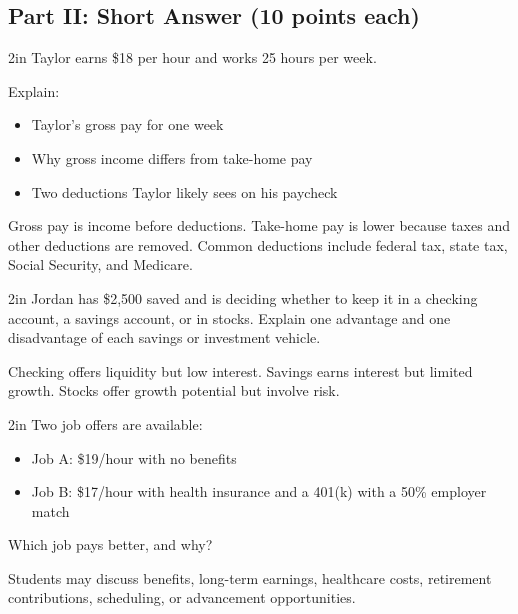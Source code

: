 \documentclass[12pt]{exam}
\begin{document}
\begin{questions}
  \section*{Part II: Short Answer (10 points each)}

  \begin{shortanswer}[10]{2in}
    Taylor earns \$18 per hour and works 25 hours per week.

    Explain:
    \begin{itemize}
      \item Taylor's gross pay for one week
      \item Why gross income differs from take-home pay
      \item Two deductions Taylor likely sees on his paycheck
    \end{itemize}
  \end{shortanswer}
  \begin{solution}
    Gross pay is income before deductions. Take-home pay is lower because taxes and other deductions are removed. Common deductions include federal tax, state tax, Social Security, and Medicare.
  \end{solution}

  \begin{shortanswer}[10]{2in}
    Jordan has \$2,500 saved and is deciding whether to keep it in a checking account, a savings account, or in stocks.
    Explain one advantage and one disadvantage of each savings or investment vehicle.
  \end{shortanswer}
  \begin{solution}
    Checking offers liquidity but low interest. Savings earns interest but limited growth. Stocks offer growth potential but involve risk.
  \end{solution}

  \begin{shortanswer}[10]{2in}
    Two job offers are available:
    \begin{itemize}
      \item Job A: \$19/hour with no benefits
      \item Job B: \$17/hour with health insurance and a 401(k) with a 50\% employer match
    \end{itemize}
    Which job pays better, and why?
  \end{shortanswer}
  \begin{solution}
    Students may discuss benefits, long-term earnings, healthcare costs, retirement contributions, scheduling, or advancement opportunities.
  \end{solution}


\end{questions}
\end{document}
